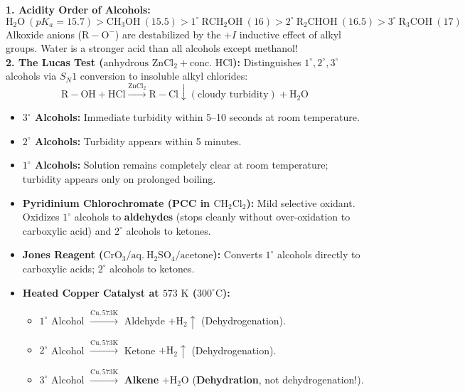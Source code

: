 \documentclass[10pt,a4paper]{article}
\begin{document}
\begin{conceptbox}
\textbf{1. Acidity Order of Alcohols:}
\begin{equation}
  \mathrm{H_2O} \ (pK_a = 15.7) > \mathrm{CH_3OH} \ (15.5) > 1^\circ \ \mathrm{RCH_2OH} \ (16) > 2^\circ \ \mathrm{R_2CHOH} \ (16.5) > 3^\circ \ \mathrm{R_3COH} \ (17)
\end{equation}
Alkoxide anions ($\mathrm{R-O^-}$) are destabilized by the $+I$ inductive effect of alkyl groups. Water is a stronger acid than all alcohols except methanol!\\
\textbf{2. The Lucas Test ($\text{anhydrous } \mathrm{ZnCl_2} + \text{conc. } \mathrm{HCl}$):}
Distinguishes $1^\circ, 2^\circ, 3^\circ$ alcohols via $S_N1$ conversion to insoluble alkyl chlorides:
\begin{equation}
  \mathrm{R-OH} + \mathrm{HCl} \xrightarrow{\mathrm{ZnCl_2}} \mathrm{R-Cl}\downarrow (\text{cloudy turbidity}) + \mathrm{H_2O}
\end{equation}
\begin{itemize}
  \item \textbf{$3^\circ$ Alcohols:} Immediate turbidity within 5--10 seconds at room temperature.
  \item \textbf{$2^\circ$ Alcohols:} Turbidity appears within 5 minutes.
  \item \textbf{$1^\circ$ Alcohols:} Solution remains completely clear at room temperature; turbidity appears only on prolonged boiling.
\end{itemize}
\end{conceptbox}

\begin{usecasebox}
\begin{itemize}
  \item \textbf{Pyridinium Chlorochromate (PCC in $\mathrm{CH_2Cl_2}$):} Mild selective oxidant. Oxidizes $1^\circ$ alcohols to \textbf{aldehydes} (stops cleanly without over-oxidation to carboxylic acid) and $2^\circ$ alcohols to ketones.
  \item \textbf{Jones Reagent ($\mathrm{CrO_3 / aq.\ H_2SO_4 / \text{acetone}}$):} Converts $1^\circ$ alcohols directly to carboxylic acids; $2^\circ$ alcohols to ketones.
  \item \textbf{Heated Copper Catalyst at $573\text{ K}$ ($300^\circ\text{C}$):}
  \begin{itemize}
    \item $1^\circ$ Alcohol $\xrightarrow{\mathrm{Cu, 573 K}}$ Aldehyde $+ \mathrm{H_2}\uparrow$ (Dehydrogenation).
    \item $2^\circ$ Alcohol $\xrightarrow{\mathrm{Cu, 573 K}}$ Ketone $+ \mathrm{H_2}\uparrow$ (Dehydrogenation).
    \item $3^\circ$ Alcohol $\xrightarrow{\mathrm{Cu, 573 K}}$ \textbf{Alkene} $+ \mathrm{H_2O}$ (\textbf{Dehydration}, not dehydrogenation!).
  \end{itemize}
\end{itemize}
\end{usecasebox}
\end{document}
